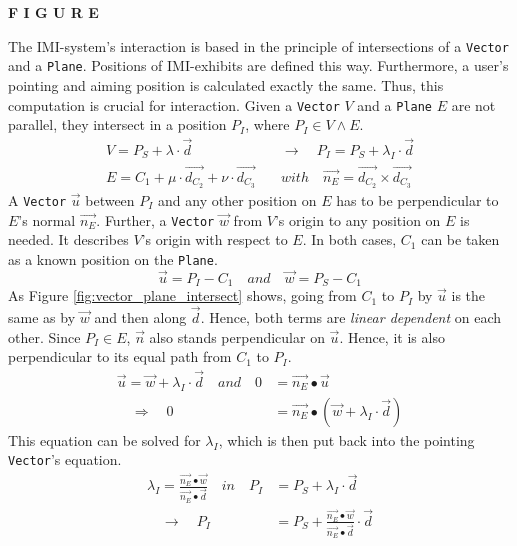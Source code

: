 \textbf{F I G U R E}

The \ac{IMI}-system's interaction is based in the principle of intersections of a \texttt{Vector} and a \texttt{Plane}. Positions of \ac{IMI}-exhibits are defined this way. Furthermore, a user's pointing and aiming position is calculated exactly the same. Thus, this computation is crucial for interaction. Given a \texttt{Vector} $V$ and a \texttt{Plane} $E$ are not parallel, they intersect in a position $P_{I}$, where $P_{I} \in V \wedge E$.   
\begin{align*}
	V = P_{S} + \lambda \cdot \overrightarrow{d} \quad &\to \quad P_{I} = P_{S} + \lambda_{I} \cdot \overrightarrow{d} \\
	E = C_{1} + \mu \cdot \overrightarrow{d_{C_{2}}} + \nu \cdot \overrightarrow{d_{C_{3}}} \quad &with \quad \overrightarrow{n_{E}} = \overrightarrow{d_{C_{2}}} \times \overrightarrow{d_{C_{3}}}
\end{align*}
A \texttt{Vector} $\overrightarrow{u}$ between $P_{I}$ and any other position on $E$ has to be perpendicular to $E$'s normal $\overrightarrow{n_{E}}$. Further, a \texttt{Vector} $\overrightarrow{w}$ from $V$'s origin to any position on $E$ is needed. It describes $V$'s origin with respect to $E$. In both cases, $C_{1}$ can be taken as a known position on the \texttt{Plane}.
$$\overrightarrow{u} = P_{I} - C_{1} \quad and \quad \overrightarrow{w} = P_{S} - C_{1}$$
As Figure \ref{fig:vector_plane_intersect} shows, going from $C_{1}$ to $P_{I}$ by $\overrightarrow{u}$ is the same as by $\overrightarrow{w}$ and then along $\overrightarrow{d}$. Hence, both terms are \textit{linear dependent} on each other. Since $P_{I} \in E$, $\overrightarrow{n}$ also stands perpendicular on $\overrightarrow{u}$. Hence, it is also perpendicular to its equal path from $C_{1}$ to $P_{I}$.
\begin{align*}
	\overrightarrow{u} = \overrightarrow{w} + \lambda_{I} \cdot \overrightarrow{d} \quad and \quad 0 &= \overrightarrow{n_{E}} \bullet \overrightarrow{u} \\
	\quad \Rightarrow \quad 0 &= \overrightarrow{n_{E}} \bullet (\overrightarrow{w} + \lambda_{I} \cdot \overrightarrow{d})
\end{align*}
This equation can be solved for $\lambda_{I}$, which is then put back into the pointing \texttt{Vector}'s equation.
\begin{align*}
	\lambda_{I} = \frac{\overrightarrow{n_{E}} \bullet \overrightarrow{w}}{\overrightarrow{n_{E}} \bullet \overrightarrow{d}} \quad in \quad P_{I} &= P_{S} + \lambda_{I} \cdot \overrightarrow{d} \\	
	\quad \to \quad P_{I} &= P_{S} + \frac{\overrightarrow{n_{E}} \bullet \overrightarrow{w}}{\overrightarrow{n_{E}} \bullet \overrightarrow{d}} \cdot \overrightarrow{d}
\end{align*}

